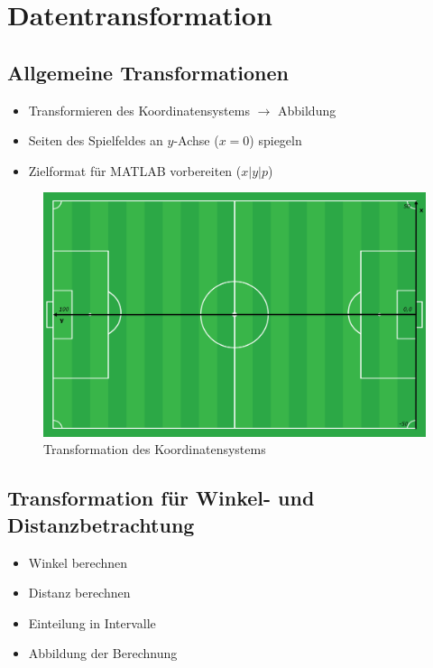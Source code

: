 \section{Datentransformation}
\label{dt}

\subsection{Allgemeine Transformationen}

\begin{itemize}
\item Transformieren des Koordinatensystems $\rightarrow$ Abbildung
\item Seiten des Spielfeldes an $y$-Achse ($x=0$) spiegeln 
\item Zielformat für MATLAB vorbereiten ($x|y|p$)
\end{itemize}

\begin{figure}[H]
\centering
\includegraphics[scale=0.28]{se-wa-jpg/transf_pitch}
\caption[Transformation des Koordinatensystems]{Transformation des Koordinatensystems}
\label{transf_pitch}
\end{figure}


\subsection{Transformation für Winkel- und Distanzbetrachtung}

\begin{itemize}
\item Winkel berechnen
\item Distanz berechnen
\item Einteilung in Intervalle
\item Abbildung der Berechnung
\end{itemize}


